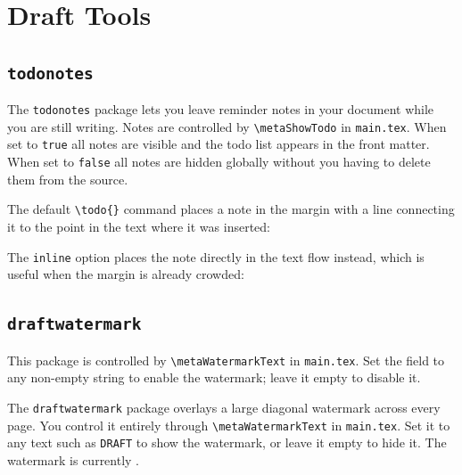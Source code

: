 \section{Draft Tools}

\subsection{\texttt{todonotes}}
The \texttt{todonotes} package lets you leave reminder notes in your document while you are still writing. Notes are controlled by \texttt{\textbackslash metaShowTodo} in \texttt{main.tex}. When set to \texttt{true} all notes are visible and the todo list appears in the front matter. When set to \texttt{false} all notes are hidden globally without you having to delete them from the source.

The default \texttt{\textbackslash todo\{\}} command places a note in the margin with a line connecting it to the point in the text where it was inserted:


The \texttt{inline} option places the note directly in the text flow instead, which is useful when the margin is already crowded:


\subsection{\texttt{draftwatermark}}
\noindent\colorbox{themecolour!15}{\parbox{\linewidth}{\small This package is controlled by \texttt{\textbackslash metaWatermarkText} in \texttt{main.tex}. Set the field to any non-empty string to enable the watermark; leave it empty to disable it.}}\vspace{0.5\baselineskip}

The \texttt{draftwatermark} package overlays a large diagonal watermark across every page. You control it entirely through \texttt{\textbackslash metaWatermarkText} in \texttt{main.tex}. Set it to any text such as \texttt{DRAFT} to show the watermark, or leave it empty to hide it. The watermark is currently .

